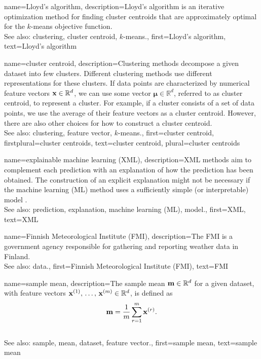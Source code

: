 { 
{name={Lloyd's algorithm}, 
	description={Lloyd's algorithm is an iterative 
	   optimization method for finding cluster centroids that are approximately 
	   optimal for the $k$-means objective function. 
				\\
		See also: clustering, cluster centroid, $k$-means.},
	first={Lloyd's algorithm},
	text={Lloyd's algorithm} 
}


{name={cluster centroid}, 
	description={Clustering methods decompose a given 
		dataset into few clusters. Different clustering methods use 
		different representations for these clusters. If data points are 
		characterized by numerical feature vectors ${\bf x} \in \mathbb{R}^{d}$, 
		we can use some vector ${\bm \mu} \in \mathbb{R}^{d}$, referred to 
		as cluster centroid, to represent a cluster. For example, if a cluster 
		consists of a set of data points, we use the average of their feature vectors 
		as a cluster centroid. However, there are also other choices for how to construct a cluster centroid. 
		\\
		See also: clustering, feature vector, $k$-means.},
	first={cluster centroid},
	firstplural={cluster centroids}, 
	text={cluster centroid}, 
	plural={cluster centroids}
}


{name={explainable machine learning (XML)}, 
	description={XML 
		methods aim to complement each prediction with an explanation of 
		how the prediction has been obtained. The construction of an explicit explanation 
		might not be necessary if the machine learning (ML) method uses a sufficiently simple (or interpretable) model \cite{rudin2019stop}.
				\\
		See also: prediction, explanation, machine learning (ML), model.},
	first={XML},
	text={XML} 
}

{name={Finnish Meteorological Institute (FMI)}, 
	description={The
		FMI is a government agency responsible for gathering 
		and reporting weather data in Finland.
				\\
		See also: data.},
	first={Finnish Meteorological Institute (FMI)},
	text={FMI} 
}
	
	
{name={sample mean}, 
	description={The sample mean 
		${\bf m} \in \mathbb{R}^{d}$ for a given dataset, with feature vectors 
		${\bf x}^{(1)}, \,\ldots, \,{\bf x}^{(m)} \in \mathbb{R}^{d}$, is defined as 
		$${\bf m} = \frac{1}{m} \sum_{r=1}^{m} {\bf x}^{(r)}.$$ 
					\\
		See also: sample, mean, dataset, feature vector.},
	first={sample mean},
	text={sample mean} 
}

}
